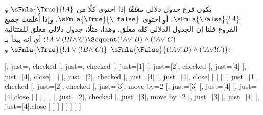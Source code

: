 \documentclass[../../../include/open-logic-section]{subfiles}
\begin{document}
يكون فرع جدول دلالي \emph{مغلقًا} إذا احتوى كلًا من
$\sFmla{\True}{!A}$ و$\sFmla{\False}{!A}$، أو احتوى
$\sFmla{\True}{\lfalse}$. وإذا أُغلقت جميع الفروع قلنا إن الجدول الدلالي كله
مغلق. وهذا، مثلًا، جدول دلالي مغلق للمتتالية
$!A\lor(!B\land !C)\Sequent(!A\lor !B)\land(!A\lor !C)$؛ أي إنه يبدأ بـ
$\sFmla{\True}{!A\lor(!B\land !C)}$ و
$\sFmla{\False}{(!A\lor !B)\land(!A\lor !C)}$:
\begin{maxwidth}
\begin{tableau}{}
  [,
    just=\TAss, checked
    [, just=\TAss, checked
      [, just={\TRule{\True}{\lor}[1]}
        [,
          just={\TRule{\False}{\land}[2]}, checked
          [,
            just={\TRule{\False}{\lor}[4]}
            [,
              just={\TRule{\False}{\lor}[4]}, close]
          ]
        ]
        [,
          just={\TRule{\False}{\land}[2]}, checked
          [,
            just={\TRule{\False}{\lor}[4]}
            [,
              just={\TRule{\False}{\lor}[4]}, close]
          ]
        ]
      ]
      [,
        just={\TRule{\True}{\lor}[1]}, checked
        [,
          just={\TRule{\False}{\land}[2]}, checked
          [,
            just={\TRule{\True}{\land}[3]}, move by=2
            [,
              just={\TRule{\True}{\land}[3]}
              [,
                just={\TRule{\False}{\lor}[4]}
                [,
                  just={\TRule{\False}{\lor}[4]},close
                ]
              ]
            ]
          ]
        ]
        [,
          just={\TRule{\False}{\land}[2]}, checked
          [,
            just={\TRule{\True}{\land}[3]}, move by=2
              [,
                just={\TRule{\True}{\land}[3]}
                [,
                  just={\TRule{\False}{\lor}[4]}
                  [,
                  just={\TRule{\False}{\lor}[4]},close
                ]
              ]
            ]
          ]
        ]
      ]
    ]
  ]
\end{tableau}
\end{maxwidth}
\end{document}
